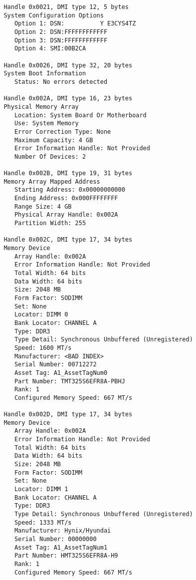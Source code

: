 \documentclass[11pt]{article}
\begin{document}
\begin{tiny}
\begin{verbatim}
         Handle 0x0021, DMI type 12, 5 bytes
         System Configuration Options
            Option 1: DSN:          Y E3CYS4TZ            
            Option 2: DSN:FFFFFFFFFFFF                    
            Option 3: DSN:FFFFFFFFFFFF                    
            Option 4: SMI:00B2CA
         
         Handle 0x0026, DMI type 32, 20 bytes
         System Boot Information
            Status: No errors detected
         
         Handle 0x002A, DMI type 16, 23 bytes
         Physical Memory Array
            Location: System Board Or Motherboard
            Use: System Memory
            Error Correction Type: None
            Maximum Capacity: 4 GB
            Error Information Handle: Not Provided
            Number Of Devices: 2
         
         Handle 0x002B, DMI type 19, 31 bytes
         Memory Array Mapped Address
            Starting Address: 0x00000000000
            Ending Address: 0x000FFFFFFFF
            Range Size: 4 GB
            Physical Array Handle: 0x002A
            Partition Width: 255
         
         Handle 0x002C, DMI type 17, 34 bytes
         Memory Device
            Array Handle: 0x002A
            Error Information Handle: Not Provided
            Total Width: 64 bits
            Data Width: 64 bits
            Size: 2048 MB
            Form Factor: SODIMM
            Set: None
            Locator: DIMM 0
            Bank Locator: CHANNEL A
            Type: DDR3
            Type Detail: Synchronous Unbuffered (Unregistered)
            Speed: 1600 MT/s
            Manufacturer: <BAD INDEX>
            Serial Number: 00712272
            Asset Tag: A1_AssetTagNum0
            Part Number: TMT325S6EFR8A-PBHJ
            Rank: 1
            Configured Memory Speed: 667 MT/s
         
         Handle 0x002D, DMI type 17, 34 bytes
         Memory Device
            Array Handle: 0x002A
            Error Information Handle: Not Provided
            Total Width: 64 bits
            Data Width: 64 bits
            Size: 2048 MB
            Form Factor: SODIMM
            Set: None
            Locator: DIMM 1
            Bank Locator: CHANNEL A
            Type: DDR3
            Type Detail: Synchronous Unbuffered (Unregistered)
            Speed: 1333 MT/s
            Manufacturer: Hynix/Hyundai  
            Serial Number: 00000000
            Asset Tag: A1_AssetTagNum1
            Part Number: HMT325S6EFR8A-H9  
            Rank: 1
            Configured Memory Speed: 667 MT/s
         

\end{verbatim}
\end{tiny}
\end{document}
